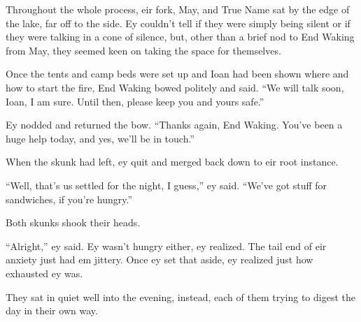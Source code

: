 Throughout the whole process, eir fork, May, and True Name sat by the edge of the lake, far off to the side. Ey couldn't tell if they were simply being silent or if they were talking in a cone of silence, but, other than a brief nod to End Waking from May, they seemed keen on taking the space for themselves.

Once the tents and camp beds were set up and Ioan had been shown where and how to start the fire, End Waking bowed politely and said. ``We will talk soon, Ioan, I am sure. Until then, please keep you and yours safe.''

Ey nodded and returned the bow. ``Thanks again, End Waking. You've been a huge help today, and yes, we'll be in touch.''

When the skunk had left, ey quit and merged back down to eir root instance.

``Well, that's us settled for the night, I guess,'' ey said. ``We've got stuff for sandwiches, if you're hungry.''

Both skunks shook their heads.

``Alright,'' ey said. Ey wasn't hungry either, ey realized. The tail end of eir anxiety just had em jittery. Once ey set that aside, ey realized just how exhausted ey was.

They sat in quiet well into the evening, instead, each of them trying to digest the day in their own way.
